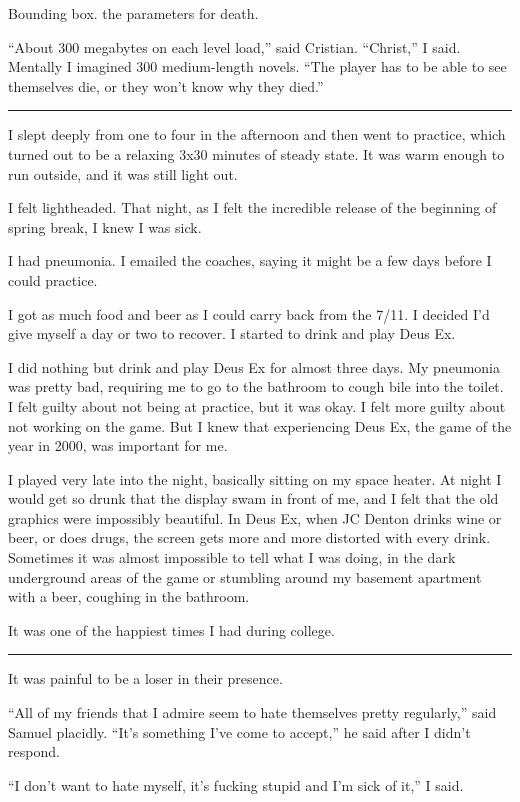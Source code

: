 Bounding box.  the parameters for death.

``About 300 megabytes on each level load,'' said Cristian.  ``Christ,'' I said.
Mentally I imagined 300 medium-length novels.  ``The player has to be able to
see themselves die, or they won't know why they died.'' 

\plainfancybreak{12pt}{2}{* * *}

I slept deeply from one to four in the afternoon and then went to practice,
which turned out to be a relaxing 3x30 minutes of steady state.  It was warm
enough to run outside, and it was still light out.

I felt lightheaded.  That night, as I felt the incredible release of the
beginning of spring break, I knew I was sick.  

I had pneumonia.  I emailed the coaches, saying it might be a few days before I
could practice.

I got as much food and beer as I could carry back from the 7/11.  I decided I'd
give myself a day or two to recover.  I started to drink and play Deus Ex.  

I did nothing but drink and play Deus Ex for almost three days.  My pneumonia
was pretty bad, requiring me to go to the bathroom to cough bile into the
toilet.  I felt guilty about not being at practice, but it was okay.  I felt
more guilty about not working on the game.  But I knew that experiencing Deus
Ex, the game of the year in 2000, was important for me.

I played very late into the night, basically sitting on my space heater.  At
night I would get so drunk that the display swam in front of me, and I felt that
the old graphics were impossibly beautiful.  In Deus Ex, when JC Denton drinks
wine or beer, or does drugs, the screen gets more and more distorted with every
drink.  Sometimes it was almost impossible to tell what I was doing, in the dark
underground areas of the game or stumbling around my basement apartment with a
beer, coughing in the bathroom.

It was one of the happiest times I had during college.

\plainfancybreak{12pt}{2}{* * *}

It was painful to be a loser in their presence.  

``All of my friends that I admire seem to hate themselves pretty regularly,''
said Samuel placidly.  ``It's something I've come to accept,'' he said after I
didn't respond.

``I don't want to hate myself, it's fucking stupid and I'm sick of it,'' I said.  

